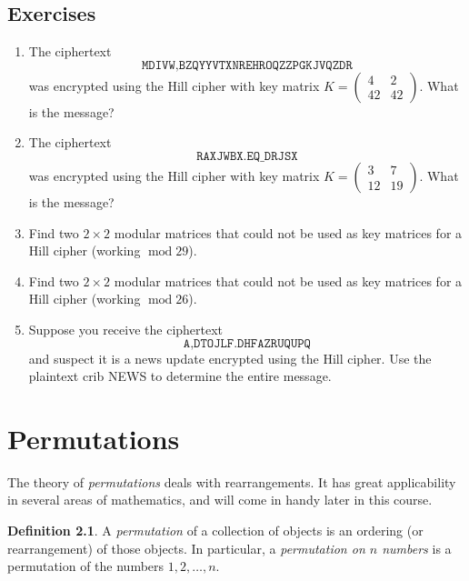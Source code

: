 \documentclass{book}
\theoremstyle{plain}
\theoremstyle{definition}
\newtheorem{definition}[theorem]{Definition}
\newif\ifprintsolutions
\newcommand{\solution}[1]{\ifprintsolutions \begin{sloppypar}{\it #1}\end{sloppypar} \fi} %
\newcommand{\ciphertext}[1]{\texttt{#1}} %
\renewcommand{\mod}{\operatorname{mod}}
\renewcommand{\mod}{\operatorname{mod}}
\begin{document}
\section{Exercises}
\begin{enumerate}
\item The ciphertext $$\ciphertext{MDIVW,BZQYYVTXNREHROQZZPGKJVQZDR}$$ was encrypted using the Hill cipher with key matrix $K = \begin{pmatrix} 4 & 2 \\ 42 & 42 \end{pmatrix}$. What is the message? \solution{It's Always Sunny in Philadelphia}
\item The ciphertext $$\ciphertext{RAXJWBX.EQ\_DRJSX}$$ was encrypted using the Hill cipher with key matrix $K = \begin{pmatrix} 3 & 7 \\ 12 & 19 \end{pmatrix}$. What is the message? \solution{Congratulations.}
\item Find two $2 \times 2$ modular matrices that could not be used as key matrices for a Hill cipher (working $\mod 29$). \solution{Choose any matrix $A$ such that $\det A \equiv 0 \mod 29$.}
\item Find two $2 \times 2$ modular matrices that could not be used as key matrices for a Hill cipher (working $\mod 26$). \solution{Choose any matrix whose determinant is not coprime to $26$.}
\item Suppose you receive the ciphertext $$\ciphertext{A,DTOJLF.DHFAZRUQUPQ}$$ and suspect it is a news update encrypted using the Hill cipher. Use the plaintext crib NEWS to determine the entire message. \solution{Key matrix $\begin{pmatrix} 17 & 10 \\ 4 & 1 \end{pmatrix}$, message ``NEWS Victory in Iraq"}
\end{enumerate}

\chapter{Permutations}
The theory of {\it permutations} deals with rearrangements. It has great applicability in several areas of mathematics, and will come in handy later in this course.

\begin{definition}
A {\it permutation} of a collection of objects is an ordering (or rearrangement) of those objects. In particular, a {\it permutation on $n$ numbers} is a permutation of the numbers $1,2,\ldots,n$.
\end{definition}
\end{document}
